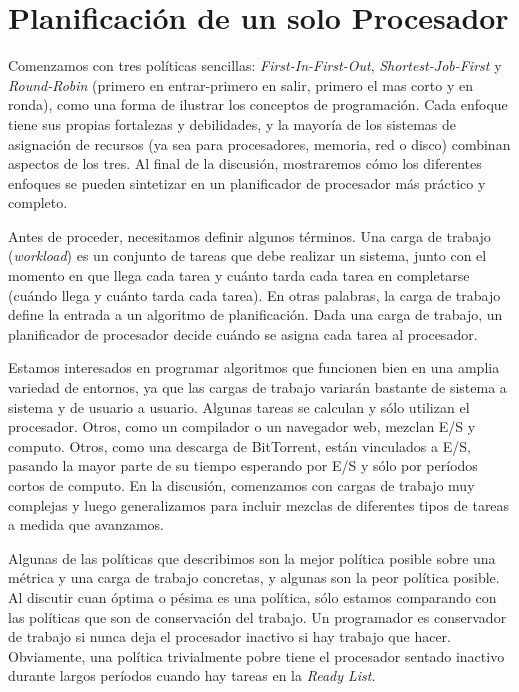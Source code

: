\documentclass[10pt]{book}
\begin{document}
\section{Planificación de un solo Procesador}
Comenzamos con tres políticas sencillas: \textit{First-In-First-Out}, \textit{Shortest-Job-First} y \textit{Round-Robin} (primero en entrar-primero en salir, primero el mas corto y en ronda), como una forma de ilustrar los conceptos de programación. Cada enfoque tiene sus propias fortalezas y debilidades, y la mayoría de los sistemas de asignación de recursos (ya sea para procesadores, memoria, red o disco) combinan aspectos de los tres. Al final de la discusión, mostraremos cómo los diferentes enfoques se pueden sintetizar en un planificador de procesador más práctico y completo.

Antes de proceder, necesitamos definir algunos términos. Una carga de trabajo (\textit{workload}) es un conjunto de tareas que debe realizar un sistema, junto con el momento en que llega cada tarea y cuánto tarda cada tarea en completarse (cuándo llega y cuánto tarda cada tarea). En otras palabras, la carga de trabajo define la entrada a un algoritmo de planificación. Dada una carga de trabajo, un planificador de procesador decide cuándo se asigna cada tarea al procesador.

Estamos interesados en programar algoritmos que funcionen bien en una amplia variedad de entornos, ya que las cargas de trabajo variarán bastante de sistema a sistema y de usuario a usuario. Algunas tareas se calculan y sólo utilizan el procesador. Otros, como un compilador o un navegador web, mezclan E/S y computo. Otros, como una descarga de BitTorrent, están vinculados a E/S, pasando la mayor parte de su tiempo esperando por E/S y sólo por períodos cortos de computo. En la discusión, comenzamos con cargas de trabajo muy complejas y luego generalizamos para incluir mezclas de diferentes tipos de tareas a medida que avanzamos.

Algunas de las políticas que describimos son la mejor política posible sobre una métrica y una carga de trabajo concretas, y algunas son la peor política posible. Al discutir cuan óptima o pésima es una política, sólo estamos comparando con las políticas que son de conservación del trabajo. Un programador es conservador de trabajo si nunca deja el procesador inactivo si hay trabajo que hacer. Obviamente, una política trivialmente pobre tiene el procesador sentado inactivo durante largos períodos cuando hay tareas en la \textit{Ready List}.
\end{document}
